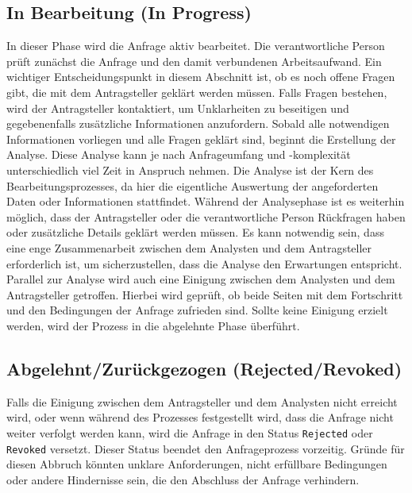 \subsection*{In Bearbeitung (In Progress)}
In dieser Phase wird die Anfrage aktiv bearbeitet. Die verantwortliche Person prüft zunächst die Anfrage und den damit verbundenen Arbeitsaufwand. Ein wichtiger Entscheidungspunkt in diesem Abschnitt ist, ob es noch offene Fragen gibt, die mit dem Antragsteller geklärt werden müssen. Falls Fragen bestehen, wird der Antragsteller kontaktiert, um Unklarheiten zu beseitigen und gegebenenfalls zusätzliche Informationen anzufordern.
\newline
Sobald alle notwendigen Informationen vorliegen und alle Fragen geklärt sind, beginnt die Erstellung der Analyse. Diese Analyse kann je nach Anfrageumfang und -komplexität unterschiedlich viel Zeit in Anspruch nehmen. Die Analyse ist der Kern des Bearbeitungsprozesses, da hier die eigentliche Auswertung der angeforderten Daten oder Informationen stattfindet.
\newline
Während der Analysephase ist es weiterhin möglich, dass der Antragsteller oder die verantwortliche Person Rückfragen haben oder zusätzliche Details geklärt werden müssen. Es kann notwendig sein, dass eine enge Zusammenarbeit zwischen dem Analysten und dem Antragsteller erforderlich ist, um sicherzustellen, dass die Analyse den Erwartungen entspricht.
\newline
Parallel zur Analyse wird auch eine Einigung zwischen dem Analysten und dem Antragsteller getroffen. Hierbei wird geprüft, ob beide Seiten mit dem Fortschritt und den Bedingungen der Anfrage zufrieden sind. Sollte keine Einigung erzielt werden, wird der Prozess in die abgelehnte Phase überführt.
\subsection*{Abgelehnt/Zur{\"u}ckgezogen (Rejected/Revoked)}
Falls die Einigung zwischen dem Antragsteller und dem Analysten nicht erreicht wird, oder wenn während des Prozesses festgestellt wird, dass die Anfrage nicht weiter verfolgt werden kann, wird die Anfrage in den Status \texttt{Rejected} oder \texttt{Revoked} versetzt. Dieser Status beendet den Anfrageprozess vorzeitig. Gründe für diesen Abbruch könnten unklare Anforderungen, nicht erfüllbare Bedingungen oder andere Hindernisse sein, die den Abschluss der Anfrage verhindern.
